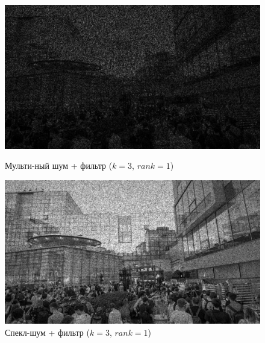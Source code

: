 \documentclass[a4paper]{article}
\begin{document}
\begin{figure}[H]
    \begin{minipage}{0.49\textwidth}
        \centering \includegraphics[width=\textwidth]{images/3_nonlinear_filters/multiplicative - rang (k=3, rank=1).jpg}
        \caption{Мульти-ный шум + фильтр ($k = 3$, $rank = 1$)}
    \end{minipage}\hfill
    \begin{minipage}{0.49\textwidth}
        \centering \includegraphics[width=\textwidth]{images/3_nonlinear_filters/speckle - rang (k=3, rank=1).jpg}
        \caption{Спекл-шум + фильтр ($k = 3$, $rank = 1$)}
    \end{minipage}
\end{figure}
\end{document}
